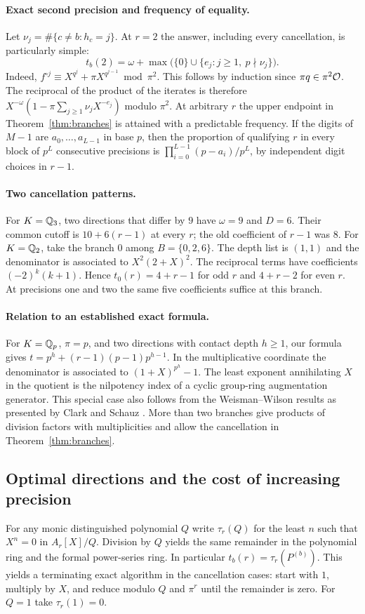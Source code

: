 \paragraph{Exact second precision and frequency of equality.}
Let $\nu_j=\#\{c\ne b:h_c=j\}$. At $r=2$ the answer, including every cancellation, is particularly simple:
\[
 t_b(2)=\omega+\max\big(\{0\}\cup\{e_j:j\ge1,\ p\nmid\nu_j\}\big).
\]
Indeed, $f^{\circ j}\equiv X^{q^j}+\pi X^{q^{j-1}}\bmod\pi^2$. This follows by induction since $\pi q\in\pi^2\mathcal O$. The reciprocal of the product of the iterates is therefore $X^{-\omega}(1-\pi\sum_{j\ge1}\nu_jX^{-e_j})$ modulo $\pi^2$. At arbitrary $r$ the upper endpoint in Theorem~\ref{thm:branches} is attained with a predictable frequency. If the digits of $M-1$ are $a_0,\ldots,a_{L-1}$ in base $p$, then the proportion of qualifying $r$ in every block of $p^L$ consecutive precisions is $\prod_{i=0}^{L-1}(p-a_i)/p^L$, by independent digit choices in $r-1$.

\paragraph{Two cancellation patterns.}
For $K=\mathbb Q_3$, two directions that differ by $9$ have $\omega=9$ and $D=6$. Their common cutoff is $10+6(r-1)$ at every $r$; the old coefficient of $r-1$ was $8$. For $K=\mathbb Q_2$, take the branch $0$ among $B=\{0,2,6\}$. The depth list is $(1,1)$ and the denominator is associated to $X^2(2+X)^2$. The reciprocal terms have coefficients $(-2)^k(k+1)$. Hence $t_0(r)=4+r-1$ for odd $r$ and $4+r-2$ for even $r$. At precisions one and two the same five coefficients suffice at this branch.

\paragraph{Relation to an established exact formula.}
For $K=\mathbb Q_p$, $\pi=p$, and two directions with contact depth $h\ge1$, our formula gives
$t=p^h+(r-1)(p-1)p^{h-1}$. In the multiplicative coordinate the denominator is associated to $(1+X)^{p^h}-1$. The least exponent annihilating $X$ in the quotient is the nilpotency index of a cyclic group-ring augmentation generator. This special case also follows from the Weisman--Wilson results as presented by Clark and Schauz \cite[Theorem 4.7]{cs}. More than two branches give products of division factors with multiplicities and allow the cancellation in Theorem~\ref{thm:branches}.

\subsection{Optimal directions and the cost of increasing precision}
For any monic distinguished polynomial $Q$ write $\tau_r(Q)$ for the least $n$ such that $X^n=0$ in $A_r[X]/Q$. Division by $Q$ yields the same remainder in the polynomial ring and the formal power-series ring. In particular $t_b(r)=\tau_r(P^{(b)})$. This yields a terminating exact algorithm in the cancellation cases: start with $1$, multiply by $X$, and reduce modulo $Q$ and $\pi^r$ until the remainder is zero. For $Q=1$ take $\tau_r(1)=0$.


